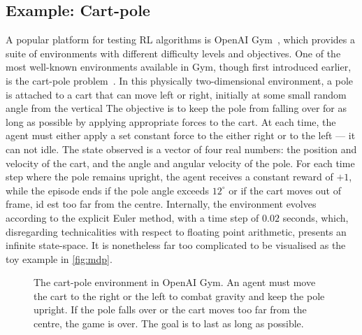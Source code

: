 \subsection{Example: Cart-pole}
\label{sec:cartpole}
A popular platform for testing RL algorithms is OpenAI Gym~\autocite{gym}, which provides a suite of environments with different difficulty levels and objectives.
One of the most well-known environments available in Gym, though first introduced earlier, is the cart-pole problem~\autocite{barto1983}.
In this physically two-dimensional environment, a pole is attached to a cart that can move left or right, initially at some small random angle from the vertical
The objective is to keep the pole from falling over for as long as possible by applying appropriate forces to the cart.
At each time, the agent must either apply a set constant force to the either right or to the left — it can not idle.
The state observed is a vector of four real numbers: the position and velocity of the cart, and the angle and angular velocity of the pole.
For each time step where the pole remains upright, the agent receives a constant reward of $+1$, while the episode ends if the pole angle exceeds $12^\circ$ or if the cart moves out of frame, id est too far from the centre.
Internally, the environment evolves according to the explicit Euler method, with a time step of $0.02$ seconds\footnotemark, which, disregarding technicalities with respect to floating point arithmetic, presents an infinite state-space.
It is nonetheless far too complicated to be visualised as the toy example in \cref{fig:mdp}.


\begin{figure}
    \centering
    \caption[
        The cart-pole environment in OpenAI Gym.
    ]{
        The cart-pole environment in OpenAI Gym.
        An agent must move the cart to the right or the left to combat gravity and keep the pole upright.
        If the pole falls over or the cart moves too far from the centre, the game is over.
        The goal is to last as long as possible.
    }
    \label{fig:cartpole}
\end{figure}


